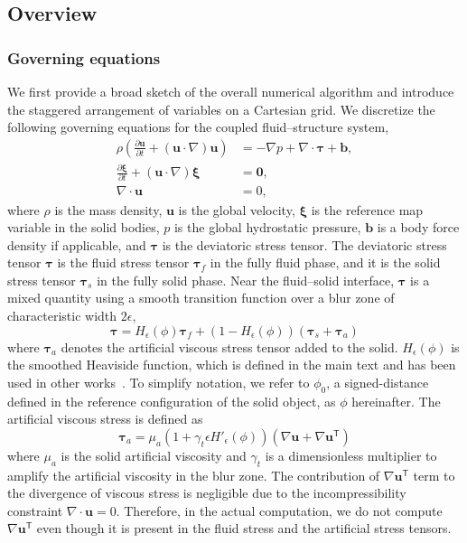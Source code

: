 \documentclass[times, 10pt]{article}
\renewcommand{\vec}[1]{\mathbf{#1}}
\newcommand{\p}{\partial}
\newcommand{\vu}{\vec{u}}
\newcommand{\vb}{\vec{b}}
\newcommand{\vxi}{\boldsymbol\xi}
\newcommand{\vtau}{\boldsymbol\tau}
\newcommand{\trans}{\mathsf{T}}
\begin{document}
\subsection{Overview}
\label{sub:overall}

\subsubsection*{Governing equations}
We first provide a broad sketch of the overall numerical algorithm and introduce the staggered arrangement of variables on a Cartesian grid.
We discretize the following governing equations for the coupled fluid--structure system,
\begin{align}
    \rho \left (\frac{\p \vu}{\p t}
    + ( \vu \cdot \nabla ) \vu \right) &= - \nabla p +\nabla \cdot \vtau + \vb, \label{eq:full_mmt}\\
    \frac{\p  \vxi}{\p t} + (\vu \cdot \nabla)  \vxi &= \vec{0}, \label{eq:xi_adv}\\
    \nabla \cdot \vu &= 0,
    \label{eq:incomp}
\end{align}
where $\rho$ is the mass density, $\vu$ is the global velocity,
$\vxi$ is the reference map variable in the solid bodies,
$p$ is the global hydrostatic pressure,
$\vec{b}$ is a body force density if applicable,
and $ \vtau$ is the deviatoric stress tensor.
The deviatoric stress tensor $ \vtau$ is the fluid stress tensor $\vtau_f$ in the fully fluid phase, and it is the solid stress tensor $\vtau_s$ in the fully solid phase.
Near the fluid--solid interface, $\vtau$ is a mixed quantity using a smooth transition function over a blur zone of characteristic width $2\epsilon$,
\begin{equation}
  \vtau = H_\epsilon(\phi)  \vtau_f   + (1-H_\epsilon(\phi)) (\vtau_s +  \vtau_a)
  \label{eq:mixed_stresses}
\end{equation}
where $\vtau_a$ denotes the artificial viscous stress tensor added to the solid.
$H_\epsilon(\phi)$ is the smoothed Heaviside function, which is defined in the main text and has been used in other works~\cite{sussman94,yu03,rycroft20}.
To simplify notation, we refer to $\phi_0$, a signed-distance defined in the reference configuration of the solid object, as $\phi$ hereinafter.
The artificial viscous stress is defined as
\begin{equation}
\vtau_a =  \mu_a( 1 + \gamma_t \epsilon H'_\epsilon(\phi)) (\nabla \vu + \nabla \vu^\trans)
\end{equation}
where $\mu_a$ is the solid artificial viscosity and $\gamma_t$ is a dimensionless multiplier to amplify the artificial viscosity in the blur zone.
The contribution of $\nabla \vu^\trans$ term to the divergence of viscous stress is negligible due to the incompressibility constraint $\nabla \cdot \vu = 0$.
Therefore, in the actual computation, we do not compute $\nabla \vu^\trans$ even though it is present in the fluid stress and the artificial stress tensors.
\end{document}
